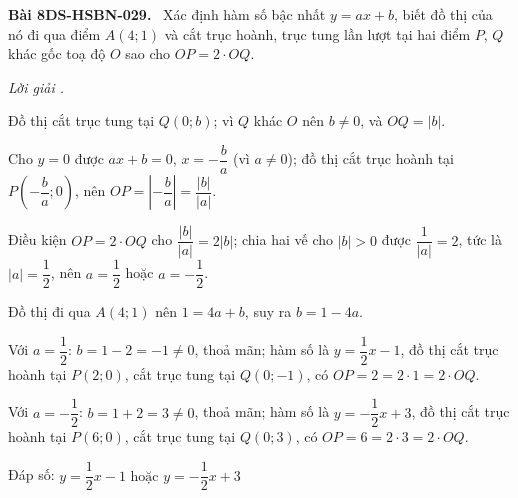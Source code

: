 \documentclass[12pt,a4paper]{article}
\newenvironment{problem}[1][]{\par\medskip\noindent\textbf{Bài #1.}\ }{\par}
\newenvironment{solution}[1][]{\par\noindent\textit{Lời giải #1.}\par}{\par}
\begin{document}
\begin{problem}[8DS-HSBN-029]
Xác định hàm số bậc nhất $y = ax + b$, biết đồ thị của nó đi qua điểm $A(4; 1)$ và cắt trục hoành, trục tung lần lượt tại hai điểm $P$, $Q$ khác gốc toạ độ $O$ sao cho $OP = 2 \cdot OQ$.

\begin{solution}
Đồ thị cắt trục tung tại $Q(0; b)$; vì $Q$ khác $O$ nên $b \neq 0$, và $OQ = |b|$.

Cho $y = 0$ được $ax + b = 0$, $x = -\dfrac{b}{a}$ (vì $a \neq 0$); đồ thị cắt trục hoành tại $P\left(-\dfrac{b}{a}; 0\right)$, nên $OP = \left|-\dfrac{b}{a}\right| = \dfrac{|b|}{|a|}$.

Điều kiện $OP = 2 \cdot OQ$ cho $\dfrac{|b|}{|a|} = 2|b|$; chia hai vế cho $|b| > 0$ được $\dfrac{1}{|a|} = 2$, tức là $|a| = \dfrac{1}{2}$, nên $a = \dfrac{1}{2}$ hoặc $a = -\dfrac{1}{2}$.

Đồ thị đi qua $A(4; 1)$ nên $1 = 4a + b$, suy ra $b = 1 - 4a$.

Với $a = \dfrac{1}{2}$: $b = 1 - 2 = -1 \neq 0$, thoả mãn; hàm số là $y = \dfrac{1}{2}x - 1$, đồ thị cắt trục hoành tại $P(2; 0)$, cắt trục tung tại $Q(0; -1)$, có $OP = 2 = 2 \cdot 1 = 2 \cdot OQ$.

Với $a = -\dfrac{1}{2}$: $b = 1 + 2 = 3 \neq 0$, thoả mãn; hàm số là $y = -\dfrac{1}{2}x + 3$, đồ thị cắt trục hoành tại $P(6; 0)$, cắt trục tung tại $Q(0; 3)$, có $OP = 6 = 2 \cdot 3 = 2 \cdot OQ$.

Đáp số: $\boxed{y = \dfrac{1}{2}x - 1 \text{ hoặc } y = -\dfrac{1}{2}x + 3}$
\end{solution}
\end{problem}
\end{document}
